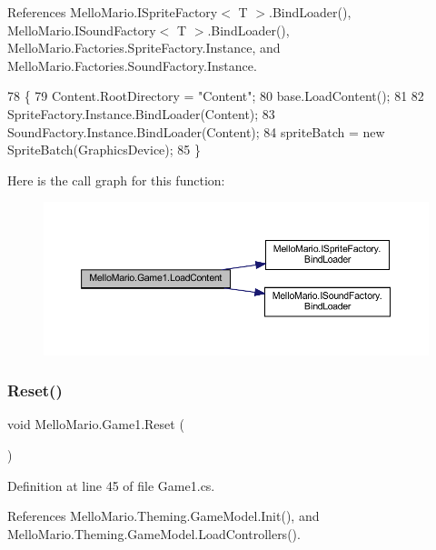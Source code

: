 References Mello\+Mario.\+I\+Sprite\+Factory$<$ T $>$.\+Bind\+Loader(), Mello\+Mario.\+I\+Sound\+Factory$<$ T $>$.\+Bind\+Loader(), Mello\+Mario.\+Factories.\+Sprite\+Factory.\+Instance, and Mello\+Mario.\+Factories.\+Sound\+Factory.\+Instance.


\begin{DoxyCode}
78         \{
79             Content.RootDirectory = \textcolor{stringliteral}{"Content"};
80             base.LoadContent();
81 
82             SpriteFactory.Instance.BindLoader(Content);
83             SoundFactory.Instance.BindLoader(Content);
84             spriteBatch = \textcolor{keyword}{new} SpriteBatch(GraphicsDevice);
85         \}
\end{DoxyCode}
Here is the call graph for this function\+:
\nopagebreak
\begin{figure}[H]
\begin{center}
\leavevmode
\includegraphics[width=350pt]{classMelloMario_1_1Game1_a101e51a2753a38970a1317b84bab0462_cgraph}
\end{center}
\end{figure}
\mbox{\label{classMelloMario_1_1Game1_a3ae863c0c57d5b278bfc755bb5d59b03}} 
\subsubsection{Reset()}
{\footnotesize\ttfamily void Mello\+Mario.\+Game1.\+Reset (\begin{DoxyParamCaption}{ }\end{DoxyParamCaption})}



Definition at line 45 of file Game1.\+cs.



References Mello\+Mario.\+Theming.\+Game\+Model.\+Init(), and Mello\+Mario.\+Theming.\+Game\+Model.\+Load\+Controllers().



